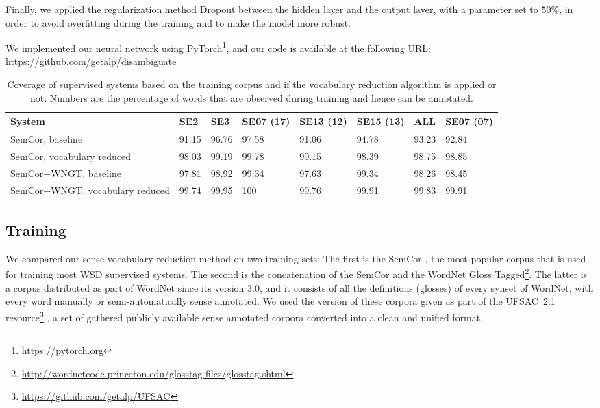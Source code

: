 \documentclass[11pt,a4paper]{article}
\begin{document}
Finally, we applied the regularization method Dropout \cite{Srivastava2014DSW26274352670313} between the hidden layer and the output layer, with a parameter set to $50\%$, in order to avoid overfitting during the training and to make the model more robust.

We implemented our neural network using PyTorch\footnote{\url{https://pytorch.org}}, and our code is available at the following URL: \newline
\url{https://github.com/getalp/disambiguate}

\begin{table*}[htbp]
\small
\begin{center}
\tabulinesep=2pt
\begin{tabu} to \linewidth {X[6.5lm]X[1cm]X[1cm]X[1cm]X[1cm]X[1cm]X[1cm]X[1cm]} \toprule
System & SE2 & SE3 & SE07 (17) & SE13 (12) & SE15 (13) & ALL & SE07 (07) \\
\midrule
SemCor, baseline & 91.15 & 96.76 & 97.58 & 91.06 & 94.78 & 93.23 & 92.84 \\
 SemCor, vocabulary reduced & 98.03 & 99.19 & 99.78 & 99.15 & 98.39 & 98.75 & 98.85 \\
\midrule
SemCor+WNGT, baseline & 97.81 & 98.92 & 99.34 & 97.63 & 99.34 & 98.26 & 98.45 \\
 SemCor+WNGT, vocabulary reduced & 99.74 & 99.95 & 100 & 99.76 & 99.91 & 99.83 & 99.91 \\
\bottomrule
\end{tabu}
\end{center}
\caption{Coverage of supervised systems based on the training corpus and if the vocabulary reduction algorithm is applied or not. Numbers are the percentage of words that are observed during training and hence can be annotated.}
\label{tab:coverage}
\end{table*}

\subsection{Training}

We compared our sense vocabulary reduction method on two training sets: The first is the SemCor \citep{Miller1993}, the most popular corpus that is used for training most WSD supervised systems. The second is the concatenation of the SemCor and the WordNet Gloss Tagged\footnote{\url{http://wordnetcode.princeton.edu/glosstag-files/glosstag.shtml}}. The latter is a corpus distributed as part of WordNet since its version 3.0, and it consists of all the definitions (glosses) of every synset of WordNet, with every word manually or semi-automatically sense annotated. We used the version of these corpora given as part of the UFSAC~2.1 resource\footnote{\url{https://github.com/getalp/UFSAC}} \citep{vialhal01718237}, a set of gathered publicly available sense annotated corpora converted into a clean and unified format.  
\end{document}
